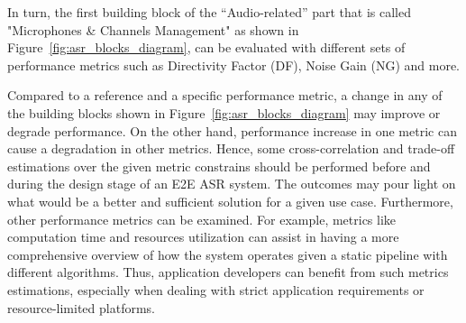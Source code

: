 \bigskip

In turn, the first building block of the 
``Audio-related'' part that is called 
"Microphones \& Channels Management" as shown 
in Figure~\ref{fig:asr_blocks_diagram},
can be evaluated with 
different sets of performance metrics 
such as Directivity Factor (DF),
Noise Gain (NG) and more.

Compared to a reference and a specific performance metric, 
a change in any of the building blocks 
shown in Figure~\ref{fig:asr_blocks_diagram} may 
improve or degrade performance. 
On the other hand,
performance increase in one metric can cause 
a degradation in other metrics.
Hence, some cross-correlation and trade-off estimations
over the given metric constrains should be performed
before and during the design stage of an E2E ASR system. 
The outcomes may pour light on what would be a better
and sufficient solution for a given use case. 
Furthermore, other performance metrics can be examined.
For example, metrics like computation time and resources utilization
can assist in having a more comprehensive overview of how the system operates given a
static pipeline with different algorithms.
Thus, application
developers can benefit from such metrics estimations,
especially when dealing with strict 
application requirements or resource-limited platforms.






